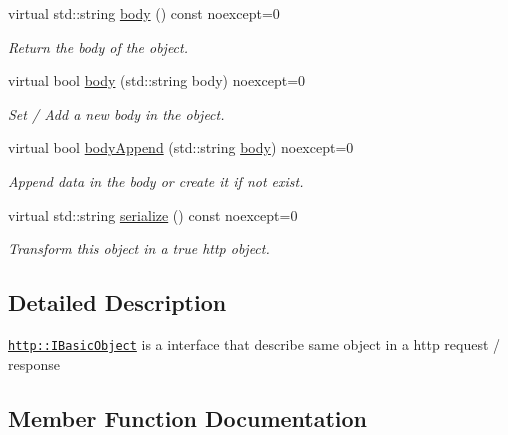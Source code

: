 \begin{DoxyCompactItemize}
virtual std\+::string \hyperlink{structhttp_1_1IBasicObject_a42eda0e62758f23d9d7d1fee01d8747a}{body} () const noexcept=0
\begin{DoxyCompactList}\small\item\em Return the body of the object. \end{DoxyCompactList}\item 
virtual bool \hyperlink{structhttp_1_1IBasicObject_aa304f3a3137912f1dbff798531fa4c09}{body} (std\+::string body) noexcept=0
\begin{DoxyCompactList}\small\item\em Set / Add a new body in the object. \end{DoxyCompactList}\item 
virtual bool \hyperlink{structhttp_1_1IBasicObject_abf2cb4a0e7908313b827ad4635bad730}{body\+Append} (std\+::string \hyperlink{structhttp_1_1IBasicObject_a42eda0e62758f23d9d7d1fee01d8747a}{body}) noexcept=0
\begin{DoxyCompactList}\small\item\em Append data in the body or create it if not exist. \end{DoxyCompactList}\item 
\mbox{\label{structhttp_1_1IBasicObject_a2d7945a7f4c4e38ce29525bb17c8a5a5}} 
virtual std\+::string \hyperlink{structhttp_1_1IBasicObject_a2d7945a7f4c4e38ce29525bb17c8a5a5}{serialize} () const noexcept=0
\begin{DoxyCompactList}\small\item\em Transform this object in a true http object. \end{DoxyCompactList}\end{DoxyCompactItemize}


\subsection{Detailed Description}
\href{http::IBasicObject}{\tt http\+::\+I\+Basic\+Object} is a interface that describe same object in a http request / response 

\subsection{Member Function Documentation}
\mbox{\label{structhttp_1_1IBasicObject_a42eda0e62758f23d9d7d1fee01d8747a}} 
